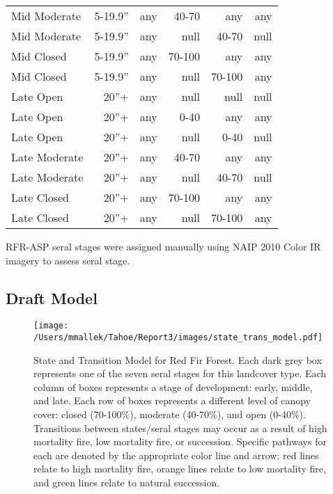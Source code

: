 \begin{table}[]
\begin{tabular}{@{}lrrrrr@{}}
Mid Moderate     & 5-19.9''        & any & 40-70  & any    & any  \\
Mid Moderate     & 5-19.9''        & any & null   & 40-70  & null \\
Mid Closed       & 5-19.9''        & any & 70-100 & any    & any  \\
Mid Closed       & 5-19.9''        & any & null   & 70-100 & any  \\
Late Open        & 20''+           & any & null   & null   & null \\
Late Open        & 20''+           & any & 0-40   & any    & any  \\
Late Open        & 20''+           & any & null   & 0-40   & null \\
Late Moderate    & 20''+           & any & 40-70  & any    & any  \\
Late Moderate    & 20''+           & any & null   & 40-70  & null \\
Late Closed      & 20''+           & any & 70-100 & any    & any  \\
Late Closed      & 20''+           & any & null   & 70-100 & any  \\ \bottomrule
\end{tabular}
\end{table}

RFR-ASP seral stages were assigned manually using NAIP 2010 Color IR imagery to assess seral stage.

\subsection*{Draft Model}
\begin{figure}[htbp]
\centering
\texttt{[image: /Users/mmallek/Tahoe/Report3/images/state\_trans\_model.pdf]}
\caption{State and Transition Model for Red Fir Forest. Each dark grey box represents one of the seven seral stages for this landcover type. Each column of boxes represents a stage of development: early, middle, and late. Each row of boxes represents a different level of canopy cover: closed (70-100\%), moderate (40-70\%), and open (0-40\%). Transitions between states/seral stages may occur as a result of high mortality fire, low mortality fire, or succession. Specific pathways for each are denoted by the appropriate color line and arrow: red lines relate to high mortality fire, orange lines relate to low mortality fire, and green lines relate to natural succession.} 
\label{transmodel}
\end{figure}

